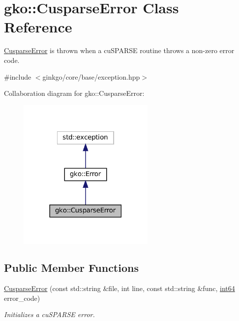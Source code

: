 \hypertarget{classgko_1_1CusparseError}{}\section{gko\+:\+:Cusparse\+Error Class Reference}
\label{classgko_1_1CusparseError}


\hyperlink{classgko_1_1CusparseError}{Cusparse\+Error} is thrown when a cu\+S\+P\+A\+R\+SE routine throws a non-\/zero error code.  




{\ttfamily \#include $<$ginkgo/core/base/exception.\+hpp$>$}



Collaboration diagram for gko\+:\+:Cusparse\+Error\+:
\nopagebreak
\begin{figure}[H]
\begin{center}
\leavevmode
\includegraphics[width=189pt]{classgko_1_1CusparseError__coll__graph}
\end{center}
\end{figure}
\subsection*{Public Member Functions}
\begin{DoxyCompactItemize}
\item 
\hyperlink{classgko_1_1CusparseError_ad51ca5caecfc2e41bd06c779d2ca57ae}{Cusparse\+Error} (const std\+::string \&file, int line, const std\+::string \&func, \hyperlink{namespacegko_a6c57dbf3168b1ecad3ea133aaf2efbc1}{int64} error\+\_\+code)
\begin{DoxyCompactList}\small\item\em Initializes a cu\+S\+P\+A\+R\+SE error. \end{DoxyCompactList}\end{DoxyCompactItemize}



